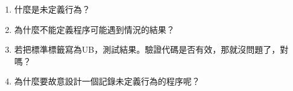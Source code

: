 \begin{enumerate}
\item 
什麼是未定義行為？

\item 
為什麼不能定義程序可能遇到情況的結果？

\item 
若把標準標籤寫為UB，測試結果。驗證代碼是否有效，那就沒問題了，對嗎？

\item
為什麼要故意設計一個記錄未定義行為的程序呢？

\end{enumerate}